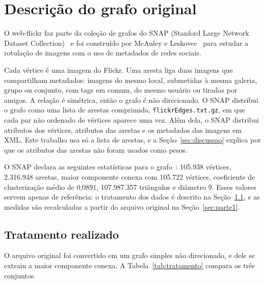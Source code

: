 \section{Descrição do grafo original}
\label{sec:descricao}

O web-flickr faz parte da coleção de grafos do SNAP (Stanford Large Network Dataset Collection)~\cite{snapnets} e foi construído por McAuley e Leskovec~\cite{mcauley2012image} para estudar a rotulação de imagens com o uso de metadados de redes sociais.

Cada vértice é uma imagem do Flickr. Uma aresta liga duas imagens que compartilham metadados: imagens do mesmo local, submetidas à mesma galeria, grupo ou conjunto, com tags em comum, do mesmo usuário ou tiradas por amigos. A relação é simétrica, então o grafo é não direcionado. O SNAP distribui o grafo como uma lista de arestas comprimida, \texttt{flickrEdges.txt.gz}, em que cada par não ordenado de vértices aparece uma vez. Além dela, o SNAP distribui atributos dos vértices, atributos das arestas e os metadados das imagens em XML. Este trabalho usa só a lista de arestas, e a Seção~\ref{sec:discussao} explica por que os atributos das arestas não foram usados como pesos.

O SNAP declara as seguintes estatísticas para o grafo~\cite{snapnets}: 105.938 vértices, 2.316.948 arestas, maior componente conexa com 105.722 vértices, coeficiente de clusterização médio de 0,0891, 107.987.357 triângulos e diâmetro 9. Esses valores servem apenas de referência: o tratamento dos dados é descrito na Seção~\ref{sec:tratamento}, e as medidas são recalculadas a partir do arquivo original na Seção~\ref{sec:parte1}.

\subsection{Tratamento realizado}
\label{sec:tratamento}

O arquivo original foi convertido em um grafo simples não direcionado, e dele se extraiu a maior componente conexa. A Tabela~\ref{tab:tratamento} compara os três conjuntos.

\begin{table}[htbp]
  \centering
  \caption{Vértices, arestas, auto-laços e arestas repetidas da lista de arestas original, do grafo simples obtido pelo tratamento e da sua maior componente conexa.}
  \label{tab:tratamento}
  
\end{table}

